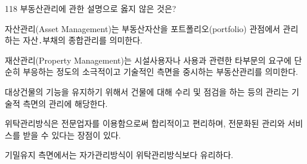 \begin{question}{118}
부동산관리에 관한 설명으로 옳지 않은 것은?
\begin{choices}
  \item 자산관리(Asset Management)는 부동산자산을 포트폴리오(portfolio) 관점에서 관리하는 자산․부채의 종합관리를 의미한다.
  \item 재산관리(Property Management)는 시설사용자나 사용과 관련한 타부문의 요구에 단순히 부응하는 정도의 소극적이고 기술적인 측면을 중시하는 부동산관리를 의미한다.
  \item 대상건물의 기능을 유지하기 위해서 건물에 대해 수리 및 점검을 하는 등의 관리는 기술적 측면의 관리에 해당한다.
  \item 위탁관리방식은 전문업자를 이용함으로써 합리적이고 편리하며, 전문화된 관리와 서비스를 받을 수 있다는 장점이 있다.
  \item 기밀유지 측면에서는 자가관리방식이 위탁관리방식보다 유리하다.
\end{choices}
\end{question}
